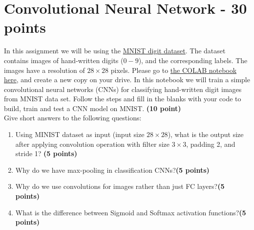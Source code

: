 \documentclass[12pt]{article}
\begin{document}

\section{Convolutional Neural Network - 30 points}
In this assignment we will be using the \href{https://www.tensorflow.org/datasets/catalog/mnist}{MNIST digit dataset}. The dataset contains images of hand-written digits ($0-9$), and the corresponding labels. The images have a resolution of $28\times 28$ pixels.
Please go to \href{https://colab.research.google.com/drive/15QluTY841KoWqVh1CQ3lM6gKrtJvdRGC#scrollTo=_ut4_8RNi1oU}{the COLAB notebook here}, and create a new copy on your drive. In this notebook we will train a simple convolutional neural networks (CNNs) for classifying hand-written digit images from MNIST data set. Follow the steps and fill in the blanks with your code to build, train and test a CNN model on MNIST. \textbf{(10 point)}\\ \newline
\noindent Give short answers to the following questions:

\begin{enumerate}[label=(\roman*)]
\item Using MINIST dataset as input (input size $28 \times 28$), what is the output size after applying convolution operation with filter size $3\times3$, padding 2, and stride 1? \textbf{(5 points)}
\item Why do we have max-pooling in classification CNNs?\textbf{(5 points)}
\item  Why do we use convolutions for images rather than
just FC layers?\textbf{(5 points)}
\item What is the difference between Sigmoid and Softmax activation functions?\textbf{(5 points)}
\end{enumerate}
\end{document}
